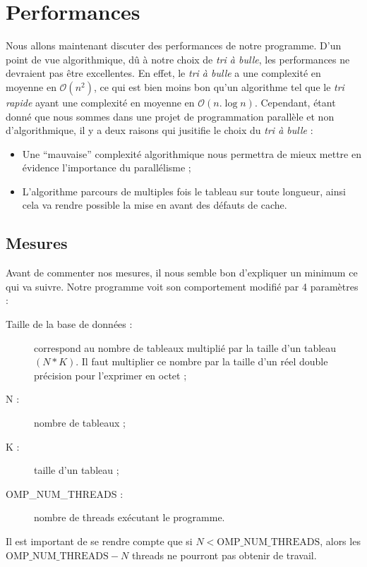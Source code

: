 \documentclass[12pt]{article}
\begin{document}
\section{Performances}

Nous allons maintenant discuter des performances de notre programme. D'un
point de vue algorithmique, dû à notre choix de \emph{tri à bulle}, les
performances ne devraient pas être excellentes. En effet, le \emph{tri à bulle}
a une complexité en moyenne en $\mathcal{O}(n^2)$, ce qui est bien moins bon
qu'un algorithme tel que le \emph{tri rapide} ayant une complexité en moyenne en
$\mathcal{O}(n.\log n)$. Cependant, étant donné que nous sommes dans une projet
de programmation parallèle et non d'algorithmique, il y a deux raisons qui
jusitifie le choix du \emph{tri à bulle} :
\begin{itemize}
    \item Une \enquote{mauvaise} complexité algorithmique nous permettra de mieux
        mettre en évidence l'importance du parallélisme ;
    \item L'algorithme parcours de multiples fois le tableau sur toute longueur,
        ainsi cela va rendre possible la mise en avant des défauts de cache.
\end{itemize}

\subsection{Mesures}

Avant de commenter nos mesures, il nous semble bon d'expliquer un minimum ce qui
va suivre. Notre programme voit son comportement modifié par 4 paramètres :
\begin{description}
    \item[Taille de la base de données :]{correspond au nombre de tableaux
        multiplié par la taille d'un tableau $(N*K)$. Il faut multiplier ce
        nombre par la taille d'un réel double précision pour l'exprimer en
        octet ;}
    \item[N :]{nombre de tableaux ;}
    \item[K :]{taille d'un tableau ;}
    \item[OMP\_NUM\_THREADS :]{nombre de threads exécutant le programme.}
\end{description}

Il est important de se rendre compte que si $N < \text{OMP\_NUM\_THREADS}$,
alors les $\text{OMP\_NUM\_THREADS} - N$ threads ne pourront pas obtenir de
travail.
\end{document}
